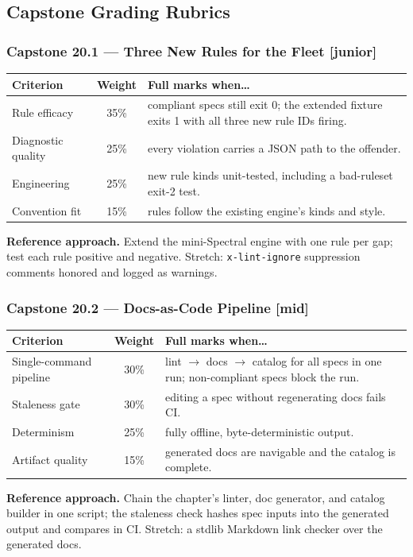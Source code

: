 \subsection{Capstone Grading Rubrics}

\subsubsection*{Capstone 20.1 --- Three New Rules for the Fleet [junior]}
\begin{center}\small
\begin{tabularx}{\textwidth}{l c X}
\toprule
\textbf{Criterion} & \textbf{Weight} & \textbf{Full marks when\ldots} \\
\midrule
Rule efficacy & 35\% & compliant specs still exit 0; the extended fixture exits 1 with all three new rule IDs firing. \\
Diagnostic quality & 25\% & every violation carries a JSON path to the offender. \\
Engineering & 25\% & new rule kinds unit-tested, including a bad-ruleset exit-2 test. \\
Convention fit & 15\% & rules follow the existing engine's kinds and style. \\
\bottomrule
\end{tabularx}
\end{center}
\textbf{Reference approach.} Extend the mini-Spectral engine with one rule
per gap; test each rule positive and negative. Stretch:
\texttt{x-lint-ignore} suppression comments honored and logged as warnings.

\subsubsection*{Capstone 20.2 --- Docs-as-Code Pipeline [mid]}
\begin{center}\small
\begin{tabularx}{\textwidth}{l c X}
\toprule
\textbf{Criterion} & \textbf{Weight} & \textbf{Full marks when\ldots} \\
\midrule
Single-command pipeline & 30\% & lint $\to$ docs $\to$ catalog for all specs in one run; non-compliant specs block the run. \\
Staleness gate & 30\% & editing a spec without regenerating docs fails CI. \\
Determinism & 25\% & fully offline, byte-deterministic output. \\
Artifact quality & 15\% & generated docs are navigable and the catalog is complete. \\
\bottomrule
\end{tabularx}
\end{center}
\textbf{Reference approach.} Chain the chapter's linter, doc generator, and
catalog builder in one script; the staleness check hashes spec inputs into
the generated output and compares in CI. Stretch: a stdlib Markdown link
checker over the generated docs.

